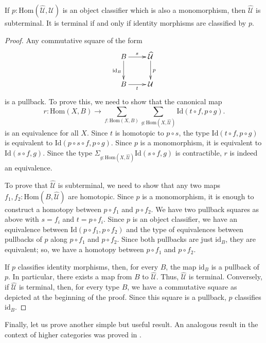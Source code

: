 \documentclass[reqno]{mscs}
\newcommand{\fs}[1]{\mathrm{#1}}
\newcommand{\Hom}{\fs{Hom}}
\newcommand{\Id}{\fs{Id}}
\newcommand{\id}{\fs{id}}
\numberwithin{figure}{section}
\begin{document}
\begin{prop}
If $p : \Hom(\widehat{\mathcal{U}},\mathcal{U})$ is an object classifier which is also a monomorphism, then $\widehat{\mathcal{U}}$ is subterminal.
It is terminal if and only if identity morphisms are classified by $p$.
\end{prop}
\begin{proof}
Any commutative square of the form
\[ \xymatrix{ B \ar[r]^s \ar[d]_{\id_B} & \widehat{\mathcal{U}} \ar[d]^p \\
              B \ar[r]_t                & \mathcal{U}
            } \]
is a pullback.
To prove this, we need to show that the canonical map
\[ r : \Hom(X,B) \to \sum_{f : \Hom(X,B)} \sum_{g : \Hom(X,\widehat{\mathcal{U}})} \Id(t \circ f, p \circ g). \]
is an equivalence for all $X$.
Since $t$ is homotopic to $p \circ s$, the type $\Id(t \circ f, p \circ g)$ is equivalent to $\Id(p \circ s \circ f, p \circ g)$.
Since $p$ is a monomorphism, it is equivalent to $\Id(s \circ f, g)$.
Since the type $\Sigma_{g : \Hom(X,\widehat{\mathcal{U}})} \Id(s \circ f, g)$ is contractible, $r$ is indeed an equivalence.

To prove that $\widehat{\mathcal{U}}$ is subterminal, we need to show that any two maps $f_1,f_2 : \Hom(B,\widehat{\mathcal{U}})$ are homotopic.
Since $p$ is a monomorphism, it is enough to construct a homotopy between $p \circ f_1$ and $p \circ f_2$.
We have two pullback squares as above with $s = f_i$ and $t = p \circ f_i$.
Since $p$ is an object classifier, we have an equivalence between $\Id(p \circ f_1, p \circ f_2)$ and the type of equivalences between pullbacks of $p$ along $p \circ f_1$ and $p \circ f_2$.
Since both pullbacks are just $\id_B$, they are equivalent; so, we have a homotopy between $p \circ f_1$ and $p \circ f_2$.

If $p$ classifies identity morphisms, then, for every $B$, the map $\id_B$ is a pullback of $p$.
In particular, there exists a map from $B$ to $\widehat{\mathcal{U}}$.
Thus, $\widehat{\mathcal{U}}$ is terminal.
Conversely, if $\widehat{\mathcal{U}}$ is terminal, then, for every type $B$, we have a commutative square as depicted at the beginning of the proof.
Since this square is a pullback, $p$ classifies $\id_B$.
\end{proof}

Finally, let us prove another simple but useful result.
An analogous result in the context of higher categories was proved in \cite[Theorem~3.28]{rasekh-eht}.
\end{document}
